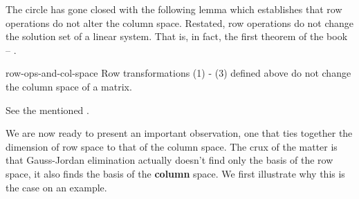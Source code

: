 The circle has gone closed with the following lemma which establishes that row
operations do not alter the column space. Restated, row operations do not change
the solution set of a linear system. That is, in fact, the first theorem of the
book -- .

\begin{lemma}{}{row-ops-and-col-space}
 Row transformations (1) - (3) defined above 
 do not change the column space of a matrix.
\end{lemma}
\begin{lemproof}
 See the mentioned .
\end{lemproof}

We are now ready to present an important observation, one that ties together the
dimension of row space to that of the column space. The crux of the matter is
that Gauss-Jordan elimination actually doesn't find only the basis of the row
space, it also finds the basis of the \textbf{column} space. We first illustrate
why this is the case on an example.

